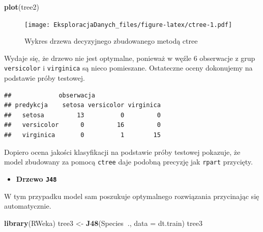 \documentclass[]{book}
\newenvironment{Shaded}{\begin{snugshade}}{\end{snugshade}}
\newcommand{\DataTypeTok}[1]{\textcolor[rgb]{0.13,0.29,0.53}{#1}}
\newcommand{\KeywordTok}[1]{\textcolor[rgb]{0.13,0.29,0.53}{\textbf{#1}}}
\newcommand{\NormalTok}[1]{#1}
\newcommand{\OperatorTok}[1]{\textcolor[rgb]{0.81,0.36,0.00}{\textbf{#1}}}
\newcommand{\StringTok}[1]{\textcolor[rgb]{0.31,0.60,0.02}{#1}}
\providecommand{\tightlist}{%
  \setlength{\itemsep}{0pt}\setlength{\parskip}{0pt}}
\theoremstyle{plain}
\theoremstyle{definition}
\theoremstyle{definition}
\theoremstyle{definition}
\theoremstyle{definition}
\theoremstyle{remark}
\begin{document}
\begin{Shaded}
\begin{Highlighting}[]
\KeywordTok{plot}\NormalTok{(tree2)}
\end{Highlighting}
\end{Shaded}

\begin{figure}
\centering
\texttt{[image: EksploracjaDanych\_files/figure-latex/ctree-1.pdf]}
\caption{\label{fig:ctree}Wykres drzewa decyzyjnego zbudowanego metodą ctree}
\end{figure}

Wydaje się, że drzewo nie jest optymalne, ponieważ w węźle 6 obserwacje z grup \texttt{versicolor} i \texttt{virginica} są nieco pomieszane. Ostateczne oceny dokonujemy na podstawie próby testowej.

\begin{Shaded}
\end{Shaded}

\begin{verbatim}
##             obserwacja
## predykcja    setosa versicolor virginica
##   setosa         13          0         0
##   versicolor      0         16         0
##   virginica       0          1        15
\end{verbatim}

Dopiero ocena jakości klasyfikacji na podstawie próby testowej pokazuje, że model zbudowany za pomocą \texttt{ctree} daje podobną precyzję jak \texttt{rpart} przycięty.

\begin{itemize}
\tightlist
\item
  \textbf{Drzewo \texttt{J48}}
\end{itemize}

W tym przypadku model sam poszukuje optymalnego rozwiązania przycinając się automatycznie.

\begin{Shaded}
\begin{Highlighting}[]
\KeywordTok{library}\NormalTok{(RWeka)}
\NormalTok{tree3 <-}\StringTok{ }\KeywordTok{J48}\NormalTok{(Species}\OperatorTok{~}\NormalTok{., }\DataTypeTok{data =}\NormalTok{ dt.train)}
\NormalTok{tree3}
\end{Highlighting}
\end{Shaded}
\end{document}
